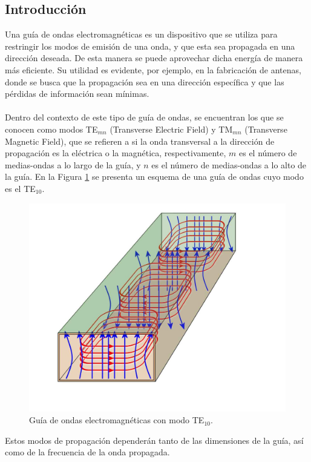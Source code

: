 \documentclass[11pt,a4paper]{article}
\begin{document}
\begin{multicols}{2}
\section{Introducción}
Una guía de ondas electromagnéticas es un dispositivo que se utiliza para restringir los modos de emisión de una onda, y que esta sea propagada en una dirección deseada. De esta manera se puede aprovechar dicha energía de manera más eficiente. Su utilidad es evidente, por ejemplo, en la fabricación de antenas, donde se busca que la propagación sea en una dirección específica y que las pérdidas de información sean mínimas. \\ \\
Dentro del contexto de este tipo de guía de ondas, se encuentran los que se conocen como modos TE$_{mn}$ (Transverse Electric Field) y TM$_{mn}$ (Transverse Magnetic Field), que se refieren a si la onda transversal a la dirección de propagación es la eléctrica o la magnética, respectivamente, $m$ es el número de medias-ondas a lo largo de la guía, y $n$ es el número de medias-ondas a lo alto de la guía. En la Figura \ref{fig:te10} se presenta un esquema de una guía de ondas cuyo modo es el TE$_{10}$.
\begin{figure}[H]
    \centering
    \includegraphics[scale=0.15]{Images/TE10.jpg}
    \caption{Guía de ondas electromagnéticas con modo TE$_{10}$.}
    \label{fig:te10}
\end{figure}
Estos modos de propagación dependerán tanto de las dimensiones de la guía, así como de la frecuencia de la onda propagada. \\ \\

\end{multicols}
\end{document}
